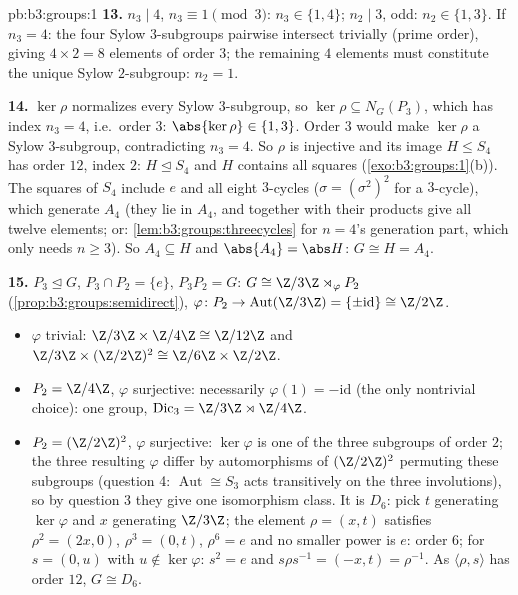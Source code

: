 \begin{solution}{pb:b3:groups:1}
\textbf{13.} $n_3 \mid 4$, $n_3 \equiv 1 \pmod 3$: $n_3 \in \{1,
4\}$; $n_2 \mid 3$, odd: $n_2 \in \{1, 3\}$. If $n_3 = 4$: the
four Sylow $3$-subgroups pairwise intersect trivially (prime
order), giving $4 \times 2 = 8$ elements of order $3$; the
remaining $4$ elements must constitute the unique Sylow
$2$-subgroup: $n_2 = 1$.

\textbf{14.} $\ker\rho$ normalizes every Sylow $3$-subgroup, so
$\ker \rho \subseteq N_G(P_3)$, which has index $n_3 = 4$, i.e.\
order $3$: $\abs{\ker\rho} \in \{1, 3\}$. Order $3$ would make
$\ker\rho$ a \emph{} Sylow $3$-subgroup, contradicting $n_3
= 4$. So $\rho$ is injective and its image $H \leq S_4$ has order
$12$, index $2$: $H \trianglelefteq S_4$ and $H$ contains all
squares (\cref{exo:b3:groups:1}(b)). The squares of $S_4$ include
$e$ and all eight $3$-cycles ($\sigma = (\sigma^2)^2$ for a
$3$-cycle), which generate $A_4$ (they lie in $A_4$, and together
with their products give all twelve elements; or:
\cref{lem:b3:groups:threecycles} for $n = 4$'s generation part,
which only needs $n \geq 3$). So $A_4 \subseteq H$ and $\abs{A_4}
= \abs H$: $G \cong H = A_4$.

\textbf{15.} $P_3 \trianglelefteq G$, $P_3 \cap P_2 = \{e\}$,
$P_3P_2 = G$: $G \cong \Z/3\Z \rtimes_\varphi P_2$
(\cref{prop:b3:groups:semidirect}), $\varphi \colon P_2 \to
\operatorname{Aut}(\Z/3\Z) = \{\pm\mathrm{id}\} \cong \Z/2\Z$.
\begin{itemize}
  \item $\varphi$ trivial:  $\Z/3\Z \times \Z/4\Z
        \cong \Z/12\Z$ and $\Z/3\Z \times (\Z/2\Z)^2 \cong \Z/6\Z
        \times \Z/2\Z$.
  \item $P_2 = \Z/4\Z$, $\varphi$ surjective: necessarily
        $\varphi(1) = -\mathrm{id}$ (the only nontrivial choice):
        one group, $\mathrm{Dic}_3 = \Z/3\Z \rtimes \Z/4\Z$.
  \item $P_2 = (\Z/2\Z)^2$, $\varphi$ surjective: $\ker\varphi$ is
        one of the three subgroups of order $2$; the three
        resulting $\varphi$ differ by automorphisms of $(\Z/2\Z)^2$
        permuting these subgroups (question 4: $\operatorname{Aut}
        \cong S_3$ acts transitively on the three involutions), so
        by question 3 they give one isomorphism class. It is
        $D_6$: pick $t$ generating $\ker\varphi$ and $x$
        generating $\Z/3\Z$; the element $\rho = (x, t)$ satisfies
        $\rho^2 = (2x, 0)$, $\rho^3 = (0, t)$, $\rho^6 = e$ and no
        smaller power is $e$: order $6$; for $s = (0, u)$ with $u
        \notin \ker\varphi$: $s^2 = e$ and $s\rho s^{-1} = (-x, t)
        = \rho^{-1}$. As $\langle \rho, s\rangle$ has order $12$,
        $G \cong D_6$.
\end{itemize}


\end{solution}
